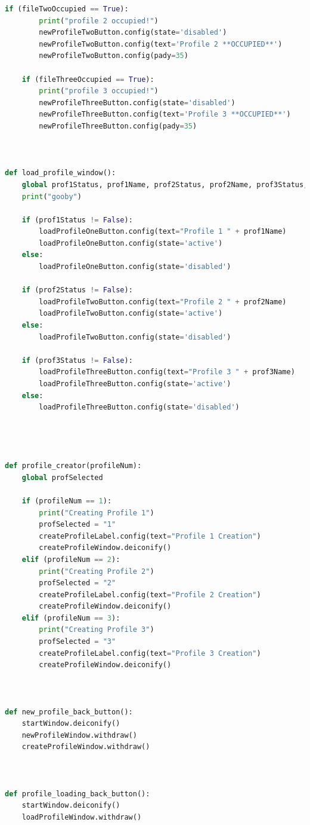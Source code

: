 \documentclass[conference]{IEEEtran}
\begin{document}
\begin{lstlisting}[language=Python, caption=GUI CODE, label=gui_code]
    if (fileTwoOccupied == True):
        print("profile 2 occupied!")
        newProfileTwoButton.config(state='disabled')
        newProfileTwoButton.config(text='Profile 2 **OCCUPIED**')
        newProfileTwoButton.config(pady=35)

    if (fileThreeOccupied == True):
        print("profile 3 occupied!")
        newProfileThreeButton.config(state='disabled')
        newProfileThreeButton.config(text='Profile 3 **OCCUPIED**')
        newProfileThreeButton.config(pady=35)



def load_profile_window():
    global prof1Status, prof1Name, prof2Status, prof2Name, prof3Status, prof3Name
    print("gooby")

    if (prof1Status != False):
        loadProfileOneButton.config(text="Profile 1 " + prof1Name)
        loadProfileOneButton.config(state='active')
    else:
        loadProfileOneButton.config(state='disabled')

    if (prof2Status != False):
        loadProfileTwoButton.config(text="Profile 2 " + prof2Name)
        loadProfileTwoButton.config(state='active')
    else:    
        loadProfileTwoButton.config(state='disabled')

    if (prof3Status != False):
        loadProfileThreeButton.config(text="Profile 3 " + prof3Name)
        loadProfileThreeButton.config(state='active')
    else:
        loadProfileThreeButton.config(state='disabled')




def profile_creator(profileNum):
    global profSelected

    if (profileNum == 1):
        print("Creating Profile 1")
        profSelected = "1"
        createProfileLabel.config(text="Profile 1 Creation")
        createProfileWindow.deiconify()
    elif (profileNum == 2):
        print("Creating Profile 2")
        profSelected = "2"
        createProfileLabel.config(text="Profile 2 Creation")
        createProfileWindow.deiconify()
    elif (profileNum == 3):
        print("Creating Profile 3")
        profSelected = "3"
        createProfileLabel.config(text="Profile 3 Creation")
        createProfileWindow.deiconify()



def new_profile_back_button():
    startWindow.deiconify()
    newProfileWindow.withdraw()
    createProfileWindow.withdraw()



def profile_loading_back_button():
    startWindow.deiconify()
    loadProfileWindow.withdraw()




\end{lstlisting}
\end{document}
